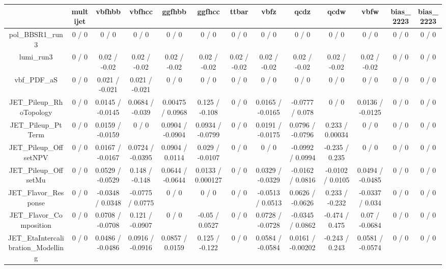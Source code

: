 \documentclass[10pt]{article}
\begin{document}
\begin{table}[htbp]
\begin{center}
\begin{tabular}{|c|c|c|c|c|c|c|c|c|c|c|c|c|}
\hline 
      & multijet      & vbfhbb      & vbfhcc      & ggfhbb      & ggfhcc      & ttbar      & vbfz      & qcdz      & qcdw      & vbfw      & bias_2223      & bias_2223 \\ 
\hline 
  pol_BBSR1_run3 & 0 / 0 & 0 / 0 & 0 / 0 & 0 / 0 & 0 / 0 & 0 / 0 & 0 / 0 & 0 / 0 & 0 / 0 & 0 / 0 & 0 / 0 & 0 / 0 \\ 
  lumi_run3 & 0 / 0 & 0.02 / -0.02 & 0.02 / -0.02 & 0.02 / -0.02 & 0.02 / -0.02 & 0.02 / -0.02 & 0.02 / -0.02 & 0.02 / -0.02 & 0.02 / -0.02 & 0.02 / -0.02 & 0 / 0 & 0 / 0 \\ 
  vbf_PDF_aS & 0 / 0 & 0.021 / -0.021 & 0.021 / -0.021 & 0 / 0 & 0 / 0 & 0 / 0 & 0 / 0 & 0 / 0 & 0 / 0 & 0 / 0 & 0 / 0 & 0 / 0 \\ 
  JET_Pileup_RhoTopology & 0 / 0 & 0.0145 / -0.0145 & 0.0684 / -0.039 & 0.00475 / 0.0968 & 0.125 / -0.108 & 0 / 0 & 0.0165 / -0.0165 & -0.0777 / 0.078 & 0 / 0 & 0.0136 / -0.0125 & 0 / 0 & 0 / 0 \\ 
  JET_Pileup_PtTerm & 0 / 0 & 0.0159 / -0.0159 & 0 / 0 & 0.0904 / -0.0904 & 0.0934 / -0.0799 & 0 / 0 & 0.0191 / -0.0175 & 0.0796 / -0.0796 & 0.233 / 0.00034 & 0 / 0 & 0 / 0 & 0 / 0 \\ 
  JET_Pileup_OffsetNPV & 0 / 0 & 0.0167 / -0.0167 & 0.0724 / -0.0395 & 0.0904 / 0.0114 & 0.029 / -0.0107 & 0 / 0 & 0 / 0 & -0.0992 / 0.0994 & -0.235 / 0.235 & 0 / 0 & 0 / 0 & 0 / 0 \\ 
  JET_Pileup_OffsetMu & 0 / 0 & 0.0529 / -0.0529 & 0.148 / -0.148 & 0.0644 / -0.0644 & 0.0133 / 0.000127 & 0 / 0 & 0.0329 / -0.0329 & -0.0162 / 0.0816 & -0.0102 / 0.0105 & 0.0494 / -0.0485 & 0 / 0 & 0 / 0 \\ 
  JET_Flavor_Response & 0 / 0 & -0.0348 / 0.0348 & -0.0775 / 0.0775 & 0 / 0 & 0 / 0 & 0 / 0 & -0.0513 / 0.0513 & 0.0626 / -0.0626 & 0.233 / -0.232 & -0.0337 / 0.034 & 0 / 0 & 0 / 0 \\ 
  JET_Flavor_Composition & 0 / 0 & 0.0708 / -0.0708 & 0.121 / -0.0907 & 0 / 0 & -0.05 / 0.0527 & 0 / 0 & 0.0728 / -0.0728 & -0.0345 / 0.0862 & -0.474 / 0.475 & 0.07 / -0.0684 & 0 / 0 & 0 / 0 \\ 
  JET_EtaIntercalibration_Modelling & 0 / 0 & 0.0486 / -0.0486 & 0.0916 / -0.0916 & 0.0857 / 0.0159 & 0.125 / -0.122 & 0 / 0 & 0.0584 / -0.0584 & 0.0161 / -0.00202 & -0.243 / 0.243 & 0.0581 / -0.0574 & 0 / 0 & 0 / 0 \\ 

\end{tabular}
\end{center}
\end{table}
\end{document}
